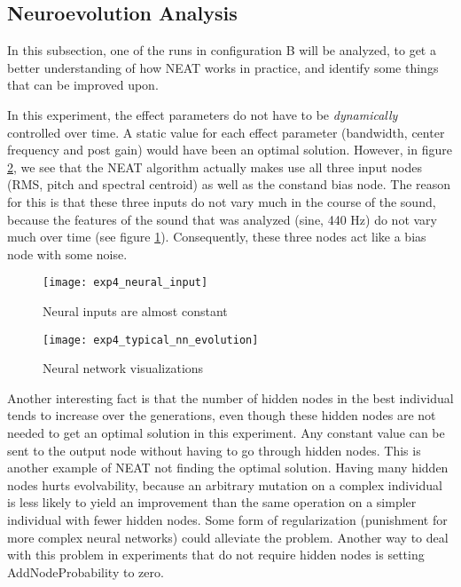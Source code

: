 \subsection{Neuroevolution Analysis}

In this subsection, one of the runs in configuration B will be analyzed, to get a better understanding of how NEAT works in practice, and identify some things that can be improved upon.

In this experiment, the effect parameters do not have to be \textit{dynamically} controlled over time. A static value for each effect parameter (bandwidth, center frequency and post gain) would have been an optimal solution. However, in figure \ref{fig:exp4_typical_nn_evolution}, we see that the NEAT algorithm actually makes use all three input nodes (RMS, pitch and spectral centroid) as well as the constand bias node. The reason for this is that these three inputs do not vary much in the course of the sound, because the features of the sound that was analyzed (sine, 440 Hz) do not vary much over time (see figure \ref{fig:exp4_neural_input}). Consequently, these three nodes act like a bias node with some noise.

\begin{figure}[H]
    \centering
    \texttt{[image: exp4\_neural\_input]}
    \caption{Neural inputs are almost constant}
    \label{fig:exp4_neural_input}
\end{figure}

\begin{figure}[H]
    \centering
    \texttt{[image: exp4\_typical\_nn\_evolution]}
    \caption{Neural network visualizations}
    \label{fig:exp4_typical_nn_evolution}
\end{figure}

Another interesting fact is that the number of hidden nodes in the best individual tends to increase over the generations, even though these hidden nodes are not needed to get an optimal solution in this experiment. Any constant value can be sent to the output node without having to go through hidden nodes. This is another example of NEAT not finding the optimal solution. Having many hidden nodes hurts evolvability, because an arbitrary mutation on a complex individual is less likely to yield an improvement than the same operation on a simpler individual with fewer hidden nodes. Some form of regularization (punishment for more complex neural networks) could alleviate the problem. Another way to deal with this problem in experiments that do not require hidden nodes is setting AddNodeProbability to zero.

